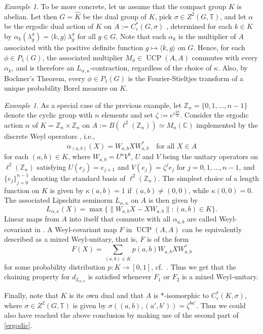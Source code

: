 \documentclass[11pt, a4paper, oneside, final, reqno]{amsart}
\newcommand{\bbZ}{\mathbb{Z}}
\newcommand{\bbC}{\mathbb{C}}
\newcommand{\bbT}{\mathbb{T}}
\newcommand{\UCP}{\operatorname{UCP}}
\theoremstyle{definition}
\theoremstyle{plain}
\theoremstyle{remark}
\newtheorem{example}[definition]{Example}
\numberwithin{equation}{section}
\begin{document}
\begin{example}
    To be more concrete, let us assume that the compact group $K$ is abelian. Let then $G=\widehat{K}$ be the dual group of $K$, pick $\sigma \in Z^2(G, \bbT)$, and let $\alpha$ be the ergodic dual action of $K$ on $A:=C_r^*(G, \sigma)$ \cite{Rieffel2004}, determined for each $k\in K$ by $\alpha_k(\lambda_g^\sigma) = \langle k, g\rangle \, \lambda_g^\sigma$ for all $g \in G$. Note that each $\alpha_k$ is the multiplier of $A$ associated with the positive definite function $g\mapsto \langle k, g\rangle$ on $G$. Hence, for each $\phi\in P_1(G)$, the associated multiplier $M_\phi \in \UCP(A, A)$  commutes with every $\alpha_k$, and is therefore an $L_{\alpha, \kappa}$-contraction, regardless of the choice of $\kappa$. Also, by Bochner's Theorem, every $\phi \in P_1(G)$ is the Fourier-Stieltjes transform of a unique probability Borel measure on $K$.
\end{example}

\begin{example}\label{ergodic2}
    As a special case of the previous example, let $\bbZ_n=\{0,1, \ldots, n-1\}$ denote the cyclic group with $n$ elements and set $\zeta := e^{i \frac{2\pi}{n}}$. Consider the ergodic action $\alpha$ of $K=\bbZ_n\times \bbZ_n$ on $A:=B(\ell^2(\bbZ_n))\simeq M_n(\bbC)$ implemented by the discrete Weyl operators \cite[Subsection 4.1.2]{W}, i.e.,
    \begin{equation*}
        \alpha_{(a,b)}(X) = W_{a,b}XW_{a,b}^* \quad \text{for all } X \in A
    \end{equation*}
    for each $(a,b) \in K$, where $W_{a, b}= U^aV^b$, $U$ and $V$ being the unitary operators on $\ell^2(\bbZ_n)$ satisfying $U(e_j)= e_{j+1}$ and $V(e_j) = \zeta^j e_j$ for $j=0, 1, \ldots, n-1$, and $\{e_j\}_{j=0}^{n-1}$ denoting the standard basis of $\ell^2(\bbZ_n)$. The simplest choice of a length function on $K$ is given by $\kappa(a,b)=1$ if $(a,b)\neq (0,0)$, while $\kappa(0,0)=0$. The associated Lipschitz seminorm $L_{\alpha, \kappa}$ on $A$ is then given by
    \begin{equation*}
        L_{\alpha, \kappa}(X) = \max\{\|W_{a, b} X - XW_{a,b}\|: (a,b)\in K\}.
    \end{equation*}
    Linear maps from $A$ into itself that commute with all $\alpha_{a,b}$ are called Weyl-covariant in \cite{W}. A Weyl-covariant map $F$ in $\UCP(A,A)$ can be equivalently described as a mixed Weyl-unitary, that is, $F$ is of the form
    \begin{equation*}
        F(X) = \sum_{(a,b)\in K} p(a,b) W_{a,b}XW_{a,b}^*
    \end{equation*}
    for some probability distribution $p:K\to [0,1]$, cf.~\cite[Corollary 4.15]{W}. Thus we get that the chaining property for $d_{L_{\alpha,\kappa}}$ is satisfied whenever $F_1$ or $F_2$ is a mixed Weyl-unitary.

    Finally, note that $K$ is its own dual and that $A$ is $*$-isomorphic to $C_r^*(K, \sigma)$, where $\sigma\in Z^2(G, \bbT)$ is given by $\sigma((a,b),(a',b'))= \zeta^{ba'}$. Thus we could also have reached the above conclusion by making use of the second part of \cref{ergodic}.
\end{example}
\end{document}
